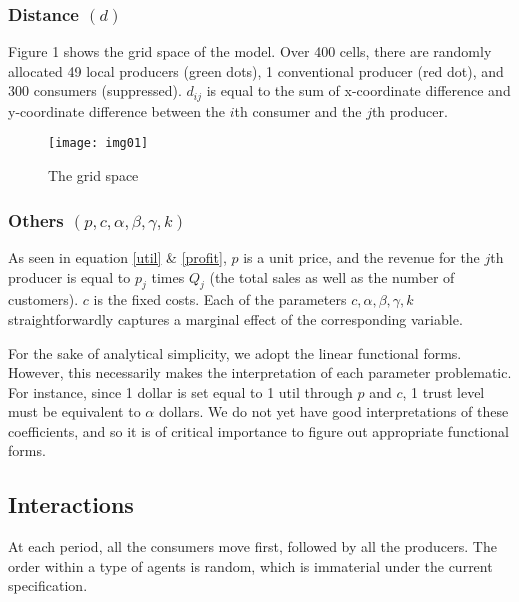 \documentclass[11pt, oneside]{article}
\begin{document}
\subsubsection{Distance $(d)$}
Figure 1 shows the grid space of the model. Over 400 cells, there are randomly allocated 49 local producers (green dots), 1 conventional producer (red dot), and 300 consumers (suppressed). $d_{ij}$ is equal to the sum of x-coordinate difference and y-coordinate difference between the $i$th consumer and the $j$th producer.
\begin{figure}[h]
\centering
  \texttt{[image: img01]}
  \caption{The grid space}
\end{figure}

\subsubsection{Others $(p, c, \alpha, \beta, \gamma, k)$}
As seen in equation \ref{util} \& \ref{profit}, $p$ is a unit price, and the revenue for the $j$th producer is equal to $p_j$ times $Q_j$ (the total sales as well as the number of customers). $c$ is the fixed costs. Each of the parameters $c, \alpha, \beta, \gamma, k$ straightforwardly captures a marginal effect of the corresponding variable.

For the sake of analytical simplicity, we adopt the linear functional forms. However, this necessarily makes the interpretation of each parameter problematic. For instance, since 1 dollar is set equal to 1 util through $p$ and $c$, 1 trust level must be equivalent to $\alpha$ dollars. We do not yet have good interpretations of these coefficients, and so it is of critical importance to figure out appropriate functional forms.

\subsection{Interactions}
At each period, all the consumers move first, followed by all the producers. The order within a type of agents is random, which is immaterial under the current specification. 
\end{document}
